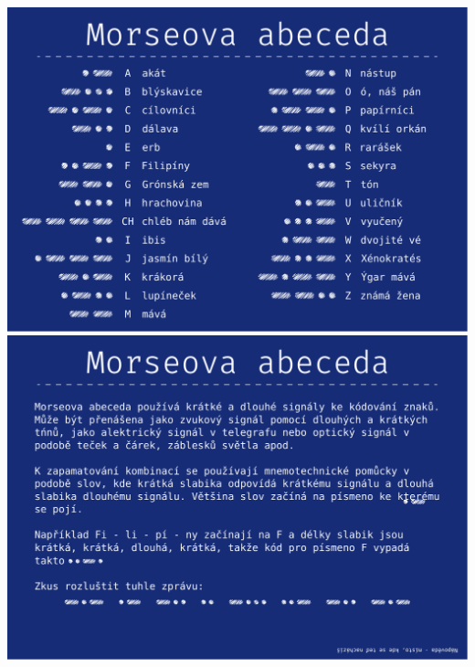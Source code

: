 \documentclass[a4paper]{article}
\begin{document}
	\noindent
	\includegraphics[width=\textwidth]{ciphers/keys/morseovka_0.pdf}
	\includegraphics[width=\textwidth]{ciphers/keys/morseovka_1.pdf}
	
\end{document}
